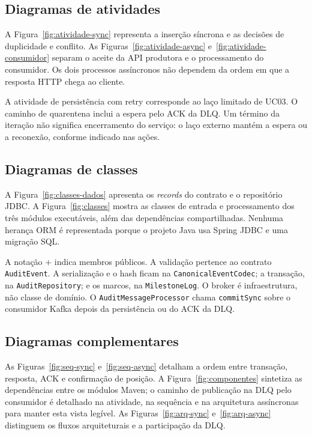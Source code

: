 \subsection{Diagramas de atividades}
A Figura~\ref{fig:atividade-sync} representa a inserção síncrona e as decisões de duplicidade e conflito. As Figuras~\ref{fig:atividade-async} e~\ref{fig:atividade-consumidor} separam o aceite da API produtora e o processamento do consumidor. Os dois processos assíncronos não dependem da ordem em que a resposta HTTP chega ao cliente.


A atividade de persistência com retry corresponde ao laço limitado de UC03. O caminho de quarentena inclui a espera pelo ACK da DLQ. Um término da iteração não significa encerramento do serviço: o laço externo mantém a espera ou a reconexão, conforme indicado nas ações.

\FloatBarrier
\subsection{Diagramas de classes}
A Figura~\ref{fig:classes-dados} apresenta os \textit{records} do contrato e o repositório JDBC. A Figura~\ref{fig:classes} mostra as classes de entrada e processamento dos três módulos executáveis, além das dependências compartilhadas. Nenhuma herança ORM é representada porque o projeto Java usa Spring JDBC e uma migração SQL.


A notação \(+\) indica membros públicos. A validação pertence ao contrato \texttt{AuditEvent}. A serialização e o hash ficam na \texttt{CanonicalEventCodec}; a transação, na \texttt{AuditRepository}; e os marcos, na \texttt{MilestoneLog}. O broker é infraestrutura, não classe de domínio. O \texttt{AuditMessageProcessor} chama \texttt{commitSync} sobre o consumidor Kafka depois da persistência ou do ACK da DLQ.

\FloatBarrier
\subsection{Diagramas complementares}
As Figuras~\ref{fig:seq-sync} e~\ref{fig:seq-async} detalham a ordem entre transação, resposta, ACK e confirmação de posição. A Figura~\ref{fig:componentes} sintetiza as dependências entre os módulos Maven; o caminho de publicação na DLQ pelo consumidor é detalhado na atividade, na sequência e na arquitetura assíncronas para manter esta vista legível. As Figuras~\ref{fig:arq-sync} e~\ref{fig:arq-async} distinguem os fluxos arquiteturais e a participação da DLQ.

